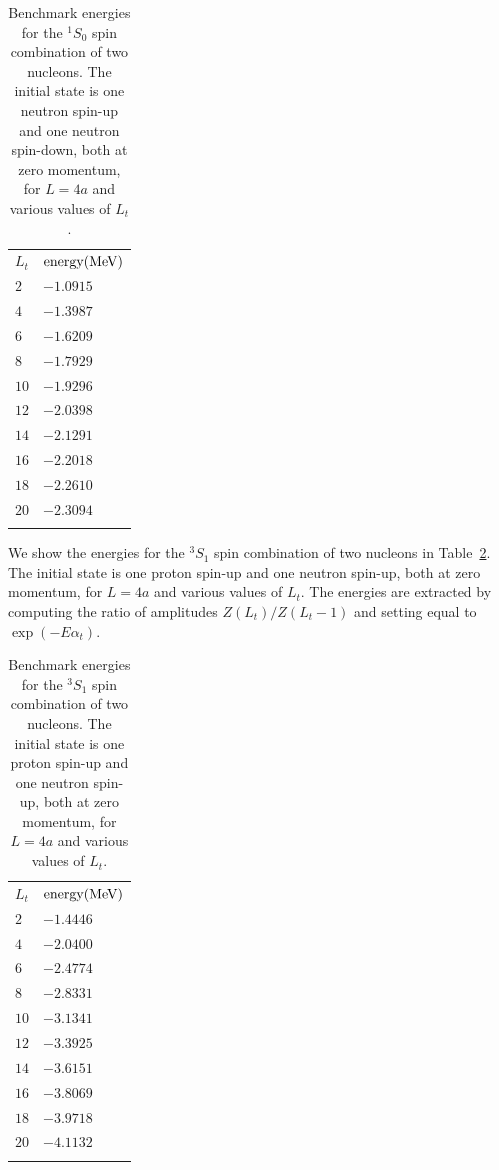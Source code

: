 \begin{table}[tbh]
\caption{Benchmark energies for the $^1S_0$ spin combination
of two nucleons.  The initial state is one
neutron spin-up and one neutron spin-down, both at zero momentum, for $L=4a$
and various values of $L_t$.}%
\begin{center}
\begin{tabular}{p{1.5cm}p{1.5cm}}
\hline\noalign{\smallskip}
$L_t$ & ${\rm energy (MeV)}$ \\
\noalign{\smallskip}\svhline\noalign{\smallskip}
$2$ & $-1.0915$  \\
$4$ & $-1.3987$  \\
$6$ & $-1.6209$  \\
$8$ & $-1.7929$  \\ 
$10$ & $-1.9296$  \\
$12$ & $-2.0398$   \\
$14$ & $-2.1291$   \\
$16$ & $-2.2018$   \\
$18$ & $-2.2610$  \\
$20$ & $-2.3094$ \\
\noalign{\smallskip}
\hline\noalign{\smallskip}
\end{tabular}
\end{center}
\label{1S0}%
\end{table}

We show the energies for the $^3S_1$ spin combination
of two nucleons in Table~\ref{3S1}.  The initial state is one
proton spin-up and one neutron spin-up, both at zero momentum, for $L=4a$
and various values of
$L_t$.  The energies are extracted by computing the
ratio of amplitudes $Z(L_t)/Z(L_t-1)$ and setting equal to $\exp(-E\alpha_t)$. 


\begin{table}[tbh]
\caption{Benchmark energies for the $^3S_1$ spin combination
of two nucleons.  The initial state is one
proton spin-up and one neutron spin-up, both at zero momentum, for $L=4a$
and various values of
$L_t$.}%
\begin{center}
\begin{tabular}{p{1.5cm}p{1.5cm}}
\hline\noalign{\smallskip}
$L_t$ & ${\rm energy (MeV)}$ \\
\noalign{\smallskip}\svhline\noalign{\smallskip}
$2$ & $-1.4446 $  \\
$4$ & $-2.0400$  \\
$6$ & $-2.4774$  \\
$8$ & $-2.8331$  \\ 
$10$ & $-3.1341$  \\
$12$ & $-3.3925$   \\
$14$ & $-3.6151$   \\
$16$ & $-3.8069 $   \\
$18$ & $-3.9718$  \\
$20$ & $-4.1132$ \\
\noalign{\smallskip}\hline\noalign{\smallskip}
\end{tabular}
\end{center}
\label{3S1}%
\end{table}


